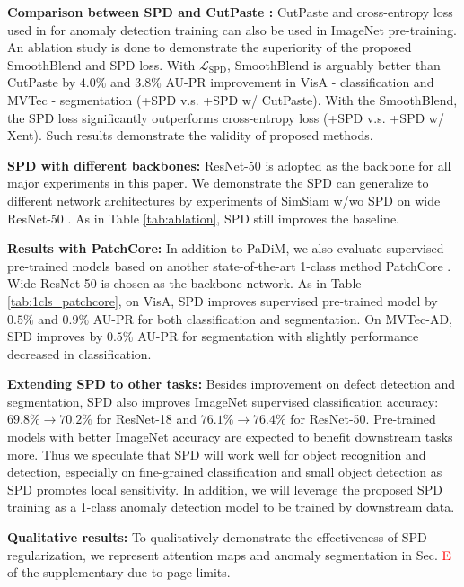 \documentclass[runningheads]{llncs}
\begin{document}
\noindent\textbf{Comparison between SPD and CutPaste \cite{li2021cutpaste}:} CutPaste and cross-entropy loss used in \cite{li2021cutpaste} for anomaly detection training can also be used in ImageNet pre-training. An ablation study is done to demonstrate the superiority of the proposed SmoothBlend and SPD loss. With $\mathcal{L}_{\mathrm{SPD}}$, SmoothBlend is arguably better than CutPaste by $4.0\%$ and $3.8\%$ AU-PR improvement in VisA - classification and MVTec - segmentation (+SPD v.s. +SPD w/ CutPaste). With the SmoothBlend, the SPD loss significantly outperforms cross-entropy loss (+SPD v.s. +SPD w/ Xent). Such results demonstrate the validity of proposed methods.

\noindent\textbf{SPD with different backbones:} ResNet-50 is adopted as the backbone for all major experiments in this paper. We demonstrate the SPD can generalize to different network architectures by experiments of SimSiam w/wo SPD on wide ResNet-50 \cite{zagoruyko2016wide}. As in Table \ref{tab:ablation}, SPD still improves the baseline.

\noindent\textbf{Results with PatchCore: }
In addition to PaDiM, we also evaluate supervised pre-trained models based on another state-of-the-art 1-class method PatchCore \cite{Roth_2022_CVPR}. Wide ResNet-50 is chosen as the backbone network. As in Table \ref{tab:1cls_patchcore}, on VisA, SPD improves supervised pre-trained model by $0.5\%$ and $0.9\%$ AU-PR for both classification and segmentation. On MVTec-AD, SPD improves by $0.5\%$ AU-PR for segmentation with slightly performance decreased in classification.

\noindent\textbf{Extending SPD to other tasks:} Besides improvement on defect detection and segmentation, SPD also improves ImageNet supervised classification accuracy:  $69.8\%\rightarrow70.2\%$ for ResNet-18 and $76.1\%\rightarrow76.4\%$ for ResNet-50.
Pre-trained models with better ImageNet accuracy are expected to benefit downstream tasks more. Thus we speculate that SPD will work well for object recognition and detection, especially on fine-grained classification and small object detection as SPD promotes local sensitivity. In addition, we will leverage the proposed SPD training as a 1-class anomaly detection model to be trained by downstream data.

\noindent\textbf{Qualitative results:} To qualitatively demonstrate the effectiveness of SPD regularization, we represent attention maps and anomaly segmentation in Sec. \textcolor{red}{E} of the supplementary due to page limits.
\end{document}
